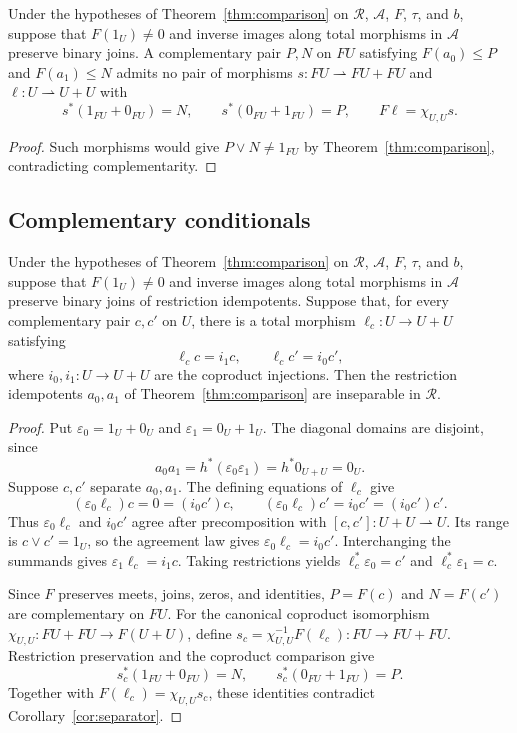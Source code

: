 \begin{corollary}\label{cor:separator}
Under the hypotheses of Theorem~\ref{thm:comparison} on
$\mathscr R$, $\mathcal A$, $F$, $\tau$, and $b$, suppose that
$F(1_U)\ne0$ and inverse images along total morphisms in $\mathcal A$ preserve
binary joins. A complementary pair $P,N$ on $FU$ satisfying
$F(a_0)\le P$ and $F(a_1)\le N$ admits no pair of morphisms
$s:FU\rightharpoonup FU+FU$ and
$\ell:U\rightharpoonup U+U$ with
\[
 s^*(1_{FU}+0_{FU})=N,\qquad
 s^*(0_{FU}+1_{FU})=P,\qquad
 F\ell=\chi_{U,U}s.
\]
\end{corollary}
\begin{proof}
Such morphisms would give $P\vee N\ne1_{FU}$ by
Theorem~\ref{thm:comparison}, contradicting complementarity.
\end{proof}

\subsection{Complementary conditionals}

\begin{corollary}
\label{cor:source-conditionals}
Under the hypotheses of Theorem~\ref{thm:comparison} on
$\mathscr R$, $\mathcal A$, $F$, $\tau$, and $b$, suppose that
$F(1_U)\ne0$ and inverse images along total morphisms in $\mathcal A$ preserve
binary joins of restriction idempotents.
Suppose that, for every complementary pair $c,c'$ on $U$, there
is a total morphism $\ell_c:U\to U+U$ satisfying
\[
 \ell_cc=i_1c,\qquad \ell_cc'=i_0c',
\]
where $i_0,i_1:U\to U+U$ are the coproduct injections.
Then the restriction idempotents $a_0,a_1$ of
Theorem~\ref{thm:comparison} are inseparable in $\mathscr R$.
\end{corollary}
\begin{proof}
Put $\varepsilon_0=1_U+0_U$ and $\varepsilon_1=0_U+1_U$.
The diagonal domains are disjoint, since
\[
 a_0a_1=h^*(\varepsilon_0\varepsilon_1)=h^*0_{U+U}=0_U.
\]
Suppose $c,c'$ separate $a_0,a_1$. The defining equations of
$\ell_c$ give
\[
 (\varepsilon_0\ell_c)c=0=(i_0c')c,\qquad
 (\varepsilon_0\ell_c)c'=i_0c'=(i_0c')c'.
\]
Thus $\varepsilon_0\ell_c$ and $i_0c'$ agree after precomposition
with $[c,c']:U+U\rightharpoonup U$. Its range is
$c\vee c'=1_U$, so the agreement law gives $\varepsilon_0\ell_c=i_0c'$.
Interchanging the summands gives $\varepsilon_1\ell_c=i_1c$.
Taking restrictions yields $\ell_c^*\varepsilon_0=c'$ and
$\ell_c^*\varepsilon_1=c$.

Since $F$ preserves meets, joins, zeros, and identities,
$P=F(c)$ and $N=F(c')$ are complementary on $FU$.
For the canonical coproduct isomorphism
$\chi_{U,U}:FU+FU\to F(U+U)$, define
$s_c=\chi_{U,U}^{-1}F(\ell_c):FU\to FU+FU$.
Restriction preservation and the coproduct comparison give
\[
 s_c^*(1_{FU}+0_{FU})=N,\qquad
 s_c^*(0_{FU}+1_{FU})=P.
\]
Together with $F(\ell_c)=\chi_{U,U}s_c$, these identities contradict
Corollary~\ref{cor:separator}.
\end{proof}

